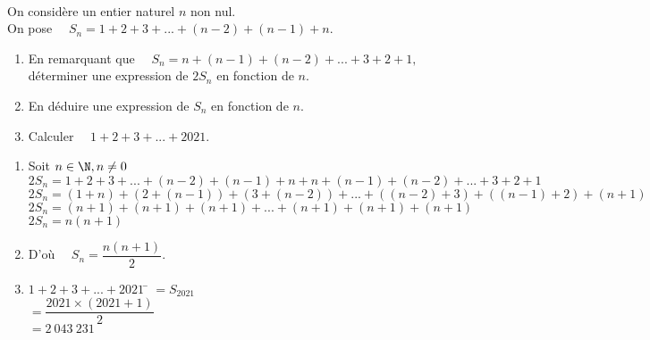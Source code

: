 \documentclass[a4paper,12pt,french]{article}
\begin{document}
\exo{}\\
On considère un entier naturel $n$ non nul.\\
On pose $\quad S_n=1+2+3+...+(n-2)+(n-1)+n$.
\begin{enumerate}[\bfseries 1.]
	\item 	En remarquant que $\quad S_n=n+(n-1)+(n-2)+...+3+2+1,\quad$ déterminer une expression de $2S_n$ en fonction de $n$.
	\item 	En déduire une expression de $S_n$ en fonction de $n$.
	\item	Calculer $\quad 1+2+3+...+2021$.
\end{enumerate}
\begin{exercicecorrection}
	\begin{enumerate}[\bfseries 1.]
		\item 	Soit $n\in \N, n\neq0$\\
		$2S_n= 1+2+3+...+(n-2)+(n-1)+n+n+(n-1)+(n-2)+...+3+2+1$\\
			$2S_n=(1+n)+\left(2+(n-1)\right)+\left(3+(n-2)\right)+...+\left((n-2)+3\right)+\left((n-1)+2\right)+\left(n+1\right)$\\
			$2S_n=(n+1)+(n+1)+(n+1)+...+(n+1)+(n+1)+(n+1)$\\
			$2S_n=n(n+1)$
		\item 	D'où $\quad S_n=\dfrac{n(n+1)}{2}$.
		\item	\begin{tabbing}
			$1+2+3+...+2021$ \=	$=S_{2021}$\\[0.5em]
			\>	$=\dfrac{2021\times (2021+1)}{2}$\\[0.5em]
			\>	$=2\ 043\ 231$
		\end{tabbing}
	\end{enumerate}
\end{exercicecorrection}
\end{document}
